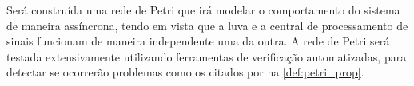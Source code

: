
Será construída uma rede de Petri que irá modelar o comportamento do sistema de maneira assíncrona, tendo em vista que a luva e a central de processamento de sinais funcionam de maneira independente uma da outra. A rede de Petri será testada extensivamente utilizando ferramentas de verificação automatizadas, para detectar se ocorrerão problemas como os citados por  na \autoref{def:petri_prop}.


